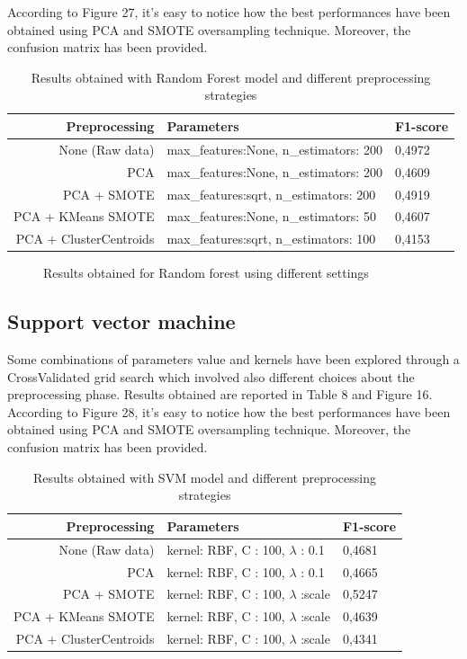 \documentclass{article}
\begin{document}
According to Figure 27, it’s easy to notice how the best performances have been obtained using PCA and SMOTE oversampling technique. Moreover, the confusion matrix has been provided.

\begin{table}[h]
\centering
\begin{tabular}{rll}
\textbf{Preprocessing} & \textbf{Parameters}                    & \textbf{F1-score} \\ \hline
None (Raw data)        & max\_features:None, n\_estimators: 200 & 0,4972            \\
PCA                    & max\_features:None, n\_estimators: 200 & 0,4609            \\
PCA + SMOTE            & max\_features:sqrt, n\_estimators: 200 & 0,4919            \\
PCA + KMeans SMOTE     & max\_features:None, n\_estimators: 50  & 0,4607            \\
PCA + ClusterCentroids & max\_features:sqrt, n\_estimators: 100 & 0,4153           
\end{tabular}
\caption{Results obtained with Random Forest model and different preprocessing strategies}
\end{table}


\begin{figure}[H]
\centering

\caption{Results obtained for Random forest using different settings}
\end{figure}

\subsection{Support vector machine}

Some combinations of parameters value and kernels have been explored through a CrossValidated grid search which involved also different choices about the preprocessing phase. Results obtained are reported in Table 8 and Figure 16.
According to Figure 28, it’s easy to notice how the best performances have been obtained using PCA and SMOTE oversampling technique. Moreover, the confusion matrix has been provided.

\begin{table}[h]
\centering
\begin{tabular}{rll}
\textbf{Preprocessing} & \textbf{Parameters}            & \textbf{F1-score} \\ \hline
None (Raw data)        & kernel: RBF, C : 100, $\lambda$ : 0.1  & 0,4681            \\
PCA                    & kernel: RBF, C : 100, $\lambda$ : 0.1  & 0,4665            \\
PCA + SMOTE            & kernel: RBF, C : 100, $\lambda$ :scale & 0,5247            \\
PCA + KMeans SMOTE     & kernel: RBF, C : 100, $\lambda$ :scale & 0,4639            \\
PCA + ClusterCentroids & kernel: RBF, C : 100, $\lambda$ :scale & 0,4341           
\end{tabular}
\caption{Results obtained with SVM model and different preprocessing strategies}
\end{table}
\end{document}
